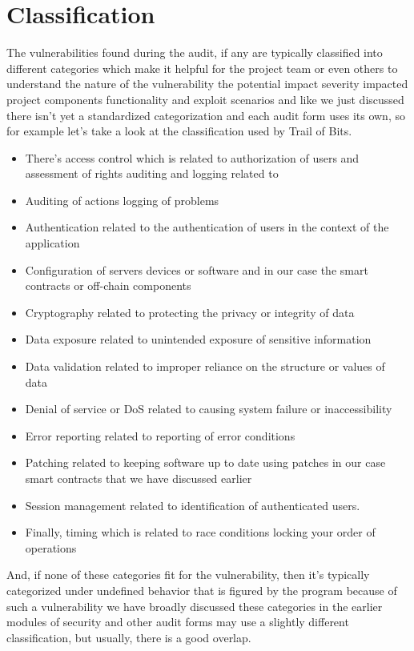 \section{Classification}

The vulnerabilities found during the audit, if any are typically classified into different categories which make it helpful for the project team or even others to understand the nature of the vulnerability the potential impact severity impacted project components functionality and exploit scenarios and like we just discussed there isn't yet a standardized categorization and each audit form uses its own, so for example let's take a look at the classification used by Trail of Bits.

\begin{itemize}
\item There's access control which is related to authorization of users and assessment of rights auditing and logging related to 
\item Auditing of actions logging of problems 
\item Authentication related to the authentication of users in the context of the application 
\item Configuration of servers devices or software and in our case the smart contracts or off-chain components 
\item Cryptography related to protecting the privacy or integrity of data 
\item Data exposure related to unintended exposure of sensitive information 
\item Data validation related to improper reliance on the structure or values of data 
\item Denial of service or DoS related to causing system failure or inaccessibility 
\item Error reporting related to reporting of error conditions 
\item Patching related to keeping software up to date using patches in our case smart contracts that we have discussed earlier 
\item Session management related to identification of authenticated users. 
\item Finally, timing which is related to race conditions locking your order of operations
\end{itemize}

And, if none of these categories fit for the vulnerability, then it's typically categorized under undefined behavior that is figured by the program because of such a vulnerability we have broadly discussed these categories in the earlier modules of security and other audit forms may use a slightly different classification, but usually, there is a good overlap.

